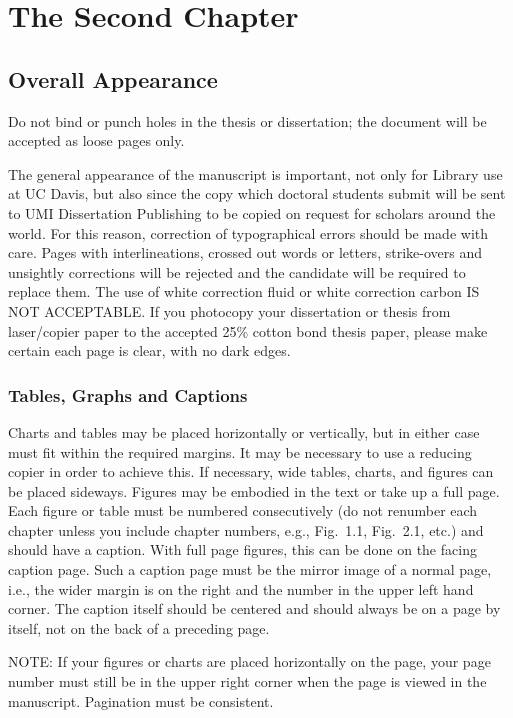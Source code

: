 \chapter{The Second Chapter}

\section{Overall Appearance}
%
Do not bind or punch holes in the thesis or dissertation; the document will be accepted as loose pages only.

The general appearance of the manuscript is important, not only for Library use at UC Davis, but also since the copy which doctoral students submit will be sent to UMI Dissertation Publishing to be copied on request for scholars around the world. For this reason, correction of typographical errors should be made with care. Pages with interlineations, crossed out words or letters, strike-overs and unsightly corrections will be rejected and the candidate will be required to replace them. The use of white correction fluid or white correction carbon IS NOT ACCEPTABLE. If you photocopy your dissertation or thesis from laser/copier paper to the accepted 25\% cotton bond thesis paper, please make certain each page is clear, with no dark edges.

\subsection{Tables, Graphs and Captions}
%
Charts and tables may be placed horizontally or vertically, but in either case must fit within the required margins. It may be necessary to use a reducing copier in order to achieve this. If necessary, wide tables, charts, and figures can be placed sideways. Figures may be embodied in the text or take up a full page. Each figure or table must be numbered consecutively (do not renumber each chapter unless you include chapter numbers, e.g., Fig.~1.1, Fig.~2.1, etc.) and should have a caption. With full page figures, this can be done on the facing caption page. Such a caption page must be the mirror image of a normal page, i.e., the wider margin is on the right and the number in the upper left hand corner. The caption itself should be centered and should always be on a page by itself, not on the back of a preceding page.

NOTE: If your figures or charts are placed horizontally on the page, your page number must still be in the upper right corner when the page is viewed in the manuscript. Pagination must be consistent.

